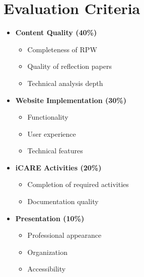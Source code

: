 \documentclass{article}
\begin{document}
\section*{Evaluation Criteria}
\begin{feubox}
\begin{itemize}[leftmargin=*]
    \item \textbf{Content Quality (40\%)}
    \begin{itemize}
        \item Completeness of RPW
        \item Quality of reflection papers
        \item Technical analysis depth
    \end{itemize}
    
    \item \textbf{Website Implementation (30\%)}
    \begin{itemize}
        \item Functionality
        \item User experience
        \item Technical features
    \end{itemize}
    
    \item \textbf{iCARE Activities (20\%)}
    \begin{itemize}
        \item Completion of required activities
        \item Documentation quality
    \end{itemize}
    
    \item \textbf{Presentation (10\%)}
    \begin{itemize}
        \item Professional appearance
        \item Organization
        \item Accessibility
    \end{itemize}
\end{itemize}
\end{feubox}
\end{document}
